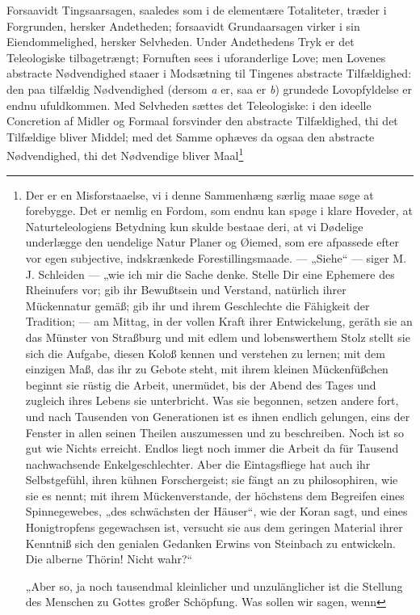 \documentclass[12pt,a4paper]{book}
\begin{document}
Forsaavidt Tingsaarsagen, saaledes som i de elementære Totaliteter, træder i
Forgrunden, hersker Andetheden; forsaavidt Grundaarsagen virker i sin
Eiendommelighed, hersker Selvheden. Under Andethedens Tryk er det Teleologiske
tilbagetrængt; Fornuften sees i uforanderlige Love; men Lovenes abstracte
Nødvendighed staaer i Modsætning til Tingenes abstracte Tilfældighed: den paa
tilfældig Nødvendighed (dersom \textit{a} er, saa er \textit{b}) grundede
Lovopfyldelse er endnu ufuldkommen. Med Selvheden sættes det Teleologiske: i
den ideelle Concretion af Midler og Formaal forsvinder den abstracte
Tilfældighed, thi det Tilfældige bliver Middel; med det Samme ophæves da ogsaa
den abstracte Nødvendighed, thi det Nødvendige bliver Maal\footnote{Der er en
Misforstaaelse, vi i denne Sammenhæng særlig maae søge at forebygge. Det er
nemlig en Fordom, som endnu kan spøge i klare Hoveder, at Naturteleologiens
Betydning kun skulde bestaae deri, at vi Dødelige underlægge den uendelige
Natur Planer og Øiemed, som ere afpassede efter vor egen subjective,
indskrænkede Forestillingsmaade. --- „Siehe“ --- siger M. J. Schleiden ---
„wie ich mir die Sache denke. Stelle Dir eine Ephemere des Rheinufers vor; gib
ihr Bewußtsein und Verstand, natürlich ihrer Mückennatur gemäß; gib ihr und
ihrem Geschlechte die Fähigkeit der Tradition; --- am Mittag, in der vollen
Kraft ihrer Entwickelung, geräth sie an das Münster von Straßburg und mit edlem
und lobenswerthem Stolz stellt sie sich die Aufgabe, diesen Koloß kennen und
verstehen zu lernen; mit dem einzigen Maß, das ihr zu Gebote steht, mit ihrem
kleinen Mückenfüßchen beginnt sie rüstig die Arbeit, unermüdet, bis der Abend
des Tages und zugleich ihres Lebens sie unterbricht. Was sie begonnen, setzen
andere fort, und nach Tausenden von Generationen ist es ihnen endlich gelungen,
eins der Fenster in allen seinen Theilen auszumessen und zu beschreiben. Noch
ist so gut wie Nichts erreicht. Endlos liegt noch immer die Arbeit da für
Tausend nachwachsende Enkelgeschlechter. Aber die Eintagsfliege hat auch ihr
Selbstgefühl, ihren kühnen Forschergeist; sie fängt an zu philosophiren, wie
sie es nennt; mit ihrem Mückenverstande, der höchstens dem Begreifen eines
Spinnegewebes, „des schwächsten der Häuser“, wie der Koran sagt, und eines
Honigtropfens gegewachsen ist, versucht sie aus dem geringen Material ihrer
Kenntniß sich den genialen Gedanken Erwins von Steinbach zu entwickeln. Die
alberne Thörin! Nicht wahr?“
\par „Aber so, ja noch tausendmal kleinlicher und unzulänglicher ist die
Stellung des Menschen zu Gottes großer Schöpfung. Was sollen wir sagen, wenn
}
\end{document}
